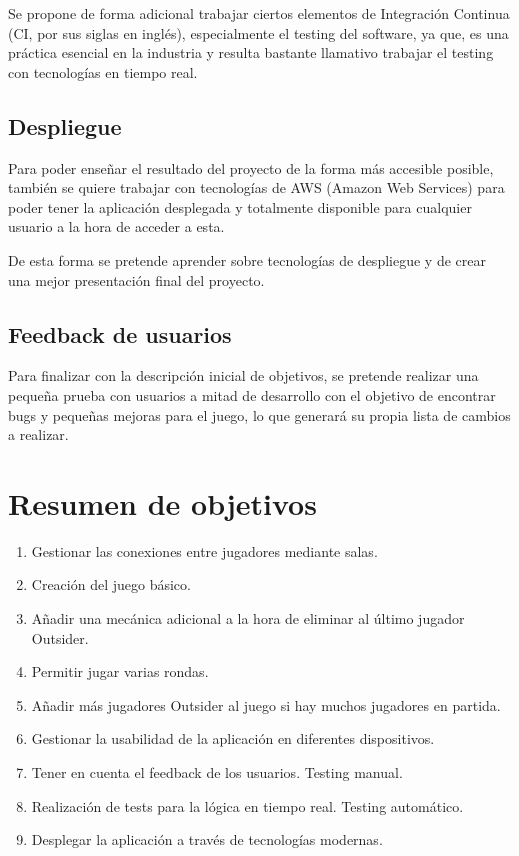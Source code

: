 Se propone de forma adicional trabajar ciertos elementos de Integración Continua (CI, por sus siglas en inglés), especialmente el testing del software, ya que, es una práctica
esencial en la industria y resulta bastante llamativo trabajar el testing con tecnologías en tiempo real.

\subsection{Despliegue}

Para poder enseñar el resultado del proyecto de la forma más accesible posible, también se quiere trabajar con tecnologías de
AWS (Amazon Web Services) para poder tener la aplicación desplegada y totalmente disponible para cualquier usuario a la hora
de acceder a esta.

De esta forma se pretende aprender sobre tecnologías de despliegue y de crear una mejor presentación final del proyecto.

\subsection{Feedback de usuarios}

Para finalizar con la descripción inicial de objetivos, se pretende realizar una pequeña prueba con usuarios a mitad de
desarrollo con el objetivo de encontrar bugs y pequeñas mejoras para el juego, lo que generará su propia lista de cambios a realizar.

\section{Resumen de objetivos}

\begin{enumerate}
    \item Gestionar las conexiones entre jugadores mediante salas.
    \item Creación del juego básico.
    \item Añadir una mecánica adicional a la hora de eliminar al último jugador Outsider.
    \item Permitir jugar varias rondas.
    \item Añadir más jugadores Outsider al juego si hay muchos jugadores en partida.
    \item Gestionar la usabilidad de la aplicación en diferentes dispositivos.
    \item Tener en cuenta el feedback de los usuarios. Testing manual.
    \item Realización de tests para la lógica en tiempo real. Testing automático.
    \item Desplegar la aplicación a través de tecnologías modernas.
\end{enumerate}